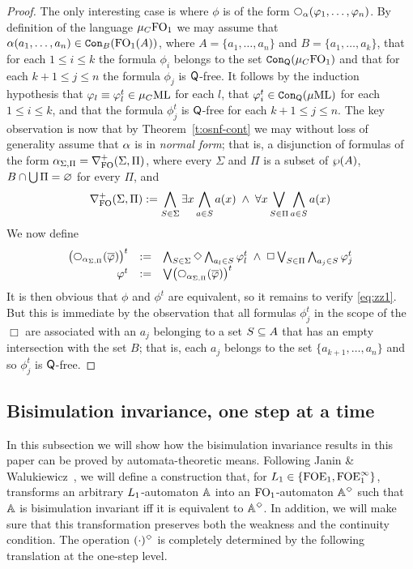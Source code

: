 \begin{proof}
The only interesting case is where $\phi$ is of the form 
$\nxt{\al}(\phi_{1},\ldots,\phi_{n})$.
By definition of the language $\mu_{C}\ofo$ we may assume that 
$\al(a_{1},\ldots,a_{n}) \in \cont{\ofo(A)}{B}$, where 
$A = \{ a_{1},\ldots,a_{n} \}$ and $B = \{ a_{1}, \ldots, a_{k} \}$,
that for each $1 \leq i \leq k$ the formula $\phi_{i}$ belongs to the set 
$\cont{\mu_{C}\ofo}{\qprop}$ and that for each $k+1\leq j \leq n$ the formula 
$\phi_{j}$ is $\qprop$-free.
It follows by the induction hypothesis 
that $\phi_{l} \equiv \phi_{l}^{t} \in \mucML$ for each $l$, 
that $\phi_{i}^{t} \in \cont{\muML}{\qprop}$ for each $1 \leq i \leq k$,
and that  the formula $\phi_{j}^{t}$ is $\qprop$-free for each $k+1\leq j \leq n$.
The key observation is now that by Theorem~\ref{t:osnf-cont} we may without 
loss of generality assume that $\al$ is in \emph{normal form}; that is, a 
disjunction of formulas of the form $\al_{\Sigma,\Pi} = \posdgbnfofo{\Sigma}{\Pi}$,
where every $\Sigma$ and $\Pi$ is a subset of $\pow (A)$, $B \cap \bigcup\Pi =
\nada$ for every $\Pi$, and 
\[
\posdgbnfofo{\Sigma}{\Pi} \isdef 
\bigwedge_{S\in\Sigma} \exists x \bigwedge_{a \in S} a(x) 
\;\land\; \forall x \bigvee_{S\in\Pi} \bigwedge_{a \in S} a(x) 
\]
We now define
\[\begin{array}{rll}
 \big(\nxt{\al_{\Sigma,\Pi}}(\ol{\phi})\big)^{t} 
& \isdef &
    \bigwedge_{S\in\Sigma} \Diamond \bigwedge_{a_{l} \in S} \phi_{l}^{t}
     \;\land\; 
     \Box \bigvee_{S\in\Pi} \bigwedge_{a_{j} \in S} \phi_{j}^{t} 
\\ \phi^{t} & \isdef & {\bigvee} \big(\nxt{\al_{\Sigma,\Pi}}(\ol{\phi})\big)^{t}
\end{array}\]
It is then obvious that $\phi$ and $\phi^{t}$ are equivalent, so it remains to 
verify \eqref{eq:zz1}.
But this is immediate by the observation that all formulas $\phi_{j}^{t}$
in the scope of the $\Box$ are associated with an $a_{j}$ belonging to a set 
$S \sse A$ that has an empty intersection with the set $B$; that is, each 
$a_{j}$ belongs to the set $\{ a_{k+1}, \ldots, a_{n}\}$ and so $\phi_{j}^{t}$
is $\qprop$-free.
\end{proof}

\subsection{Bisimulation invariance, one step at a time}
\label{ss:bisinv}

In this subsection we will show how the bisimulation invariance results in this
paper can be proved by automata-theoretic means.
Following Janin \& Walukiewicz~\cite{Jan96}, 
we will define a construction that, for $\oslang \in \{{\ofoe},{\ofoei}\}$, 
transforms an arbitrary $\oslang$-automaton $\bbA$ into an $\ofo$-automaton 
$\bbA^{\tmod}$ such that $\bbA$ is bisimulation invariant iff it is equivalent
to $\bbA^{\tmod}$.
In addition, we will make sure that this transformation preserves both the
weakness and the continuity condition.
The operation $(\cdot)^{\tmod}$ is completely determined by the following 
translation at the one-step level.

